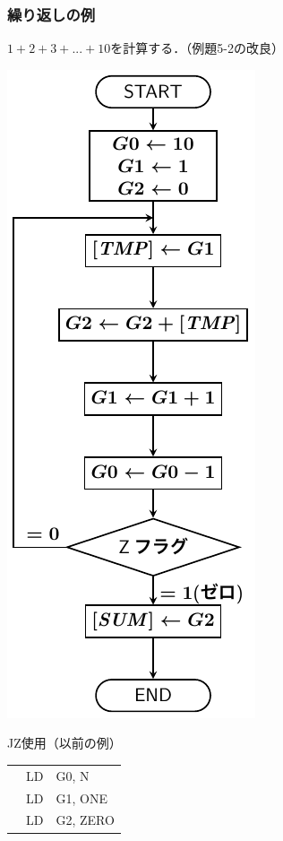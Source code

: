 \documentclass[handout]{beamer}        %
\begin{document}
\begin{frame}
  \frametitle{繰り返しの例}
  $1 + 2 + 3 + ... + 10$を計算する．（例題5-2の改良）\\
  \vfill
  \begin{minipage}{0.26\columnwidth}
    \centerline{\includegraphics[scale=0.55]{../Tikz/flow3A.pdf}}
  \end{minipage}
  \begin{minipage}{0.36\columnwidth}
    {\ttfamily JZ使用（以前の例）\\\scriptsize
      \begin{tabular}{|l|l|l|}
              & LD     & G0, N    \\
              & LD     & G1, ONE  \\
              & LD     & G2, ZERO \\

\end{tabular}}
\end{minipage}
\end{frame}
\end{document}

